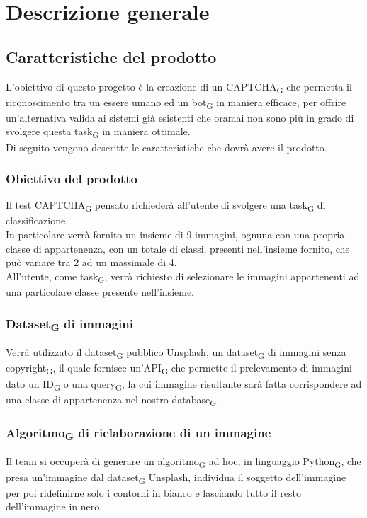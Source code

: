 \section{Descrizione generale}

\subsection{Caratteristiche del prodotto}
L'obiettivo di questo progetto è la creazione di un CAPTCHA\textsubscript{G} che permetta il riconoscimento tra un essere umano ed un bot\textsubscript{G} in maniera efficace, per offrire un'alternativa valida ai sistemi già esistenti che oramai non sono più in grado di svolgere questa task\textsubscript{G} in maniera ottimale.\\

\noindent Di seguito vengono descritte le caratteristiche che dovrà avere il prodotto.

\subsubsection{Obiettivo del prodotto}
Il test CAPTCHA\textsubscript{G} pensato richiederà all'utente di svolgere una task\textsubscript{G} di classificazione.\\
In particolare verrà fornito un insieme di 9 immagini, ognuna con una propria classe di appartenenza, con un totale di classi, presenti nell'insieme fornito, che può variare tra 2 ad un massimale di 4.\\
All'utente, come task\textsubscript{G}, verrà richiesto di selezionare le immagini appartenenti ad una particolare classe presente nell'insieme.

\subsubsection{Dataset\textsubscript{G} di immagini}
Verrà utilizzato il dataset\textsubscript{G} pubblico Unsplash, un dataset\textsubscript{G} di immagini senza copyright\textsubscript{G}, il quale fornisce un'API\textsubscript{G} che permette il prelevamento di immagini dato un ID\textsubscript{G} o una query\textsubscript{G}, la cui immagine risultante sarà fatta corrispondere ad una classe di appartenenza nel nostro database\textsubscript{G}.

\subsubsection{Algoritmo\textsubscript{G} di rielaborazione di un immagine}
Il team si occuperà di generare un algoritmo\textsubscript{G} ad hoc, in linguaggio Python\textsubscript{G}, che presa un'immagine dal dataset\textsubscript{G} Unsplash, individua il soggetto dell'immagine per poi ridefinirne solo i contorni in bianco e lasciando tutto il resto dell'immagine in nero.  

